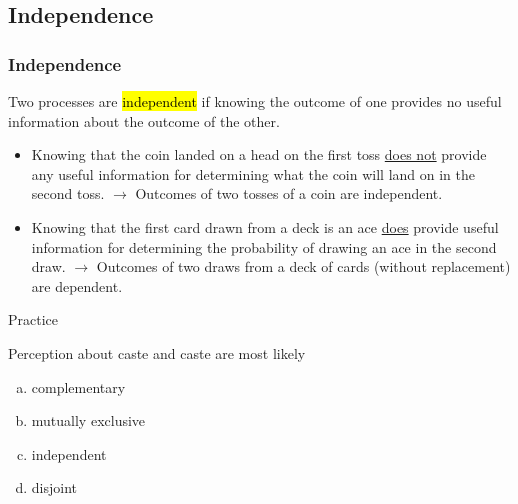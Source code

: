 \documentclass[notes,11pt, aspectratio=169]{beamer}
\begin{document}

\subsection{Independence}


\begin{frame}
\frametitle{Independence}

Two processes are \hl{independent} if knowing the outcome of one provides no useful information about the outcome of the other.

\pause

\begin{itemize}

\item Knowing that the coin landed on a head on the first toss \underline{does not} provide any useful information for determining what the coin will land on in the second toss. $\rightarrow$ Outcomes of two tosses of a coin are independent.

\pause

\item Knowing that the first card drawn from a deck is an ace \underline{does} provide useful information for determining the probability of drawing an ace in the second draw. $\rightarrow$ Outcomes of two draws from a deck of cards (without replacement) are dependent.

\end{itemize}

\end{frame}

\begin{frame}{Practice}

Perception about caste and caste are most likely
\begin{enumerate}[(a)]
\item complementary
\item mutually exclusive
\item independent
\item disjoint
\end{enumerate}



\end{frame}
\end{document}
